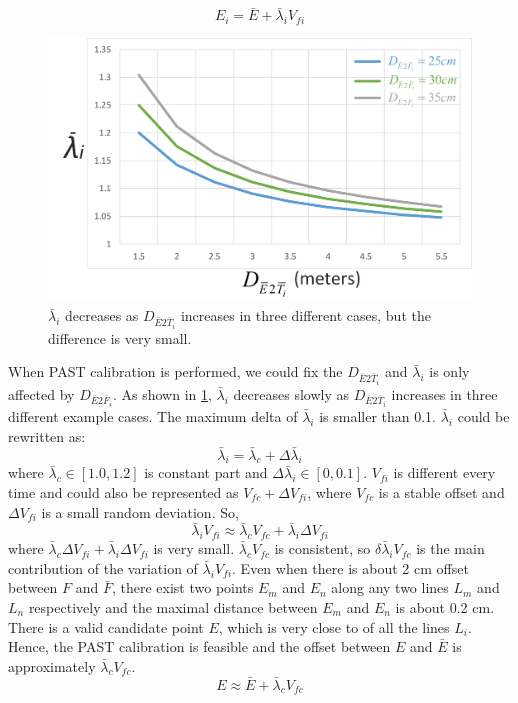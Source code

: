 \begin{equation} \label{equ:P_eye2}
E_i = {\bar E} + \bar\lambda_i V_{fi}  
\end{equation}
\begin{figure} [htb]
	\centering
	\includegraphics[width= \linewidth]{figures/3-PAST/lambdai.png}
	\caption{$\bar \lambda_i$ decreases as $D_{\bar E2 \bar T_i}$ increases in three different cases, but the difference is very small.}
	\label{fig:3-PAST:lambdai}
\end{figure}
When PAST calibration is performed, we could fix the $D_{\bar E2 \bar T_i}$ and $\bar \lambda_i$ is only affected by $ D_{\bar E2 \bar F_i}$. As shown in \figurename{ \ref{fig:3-PAST:lambdai}}, $\bar \lambda_i$ decreases slowly as $D_{\bar E2 \bar T_i}$ increases in three different example cases. The maximum delta of $\bar \lambda_i$ is smaller than 0.1. $\bar\lambda_i$ could be rewritten as:
\begin{equation} \label{equ:lambdai}
\bar\lambda_i = \bar\lambda_c + \Delta \bar\lambda_i
\end{equation}
where $\bar\lambda_c \in \left[1.0,1.2\right]$ is constant part and $\Delta \bar\lambda_i \in \left[0,0.1\right] $. 
$V_{fi}$ is different every time and could also be represented as $V_{fc} + {\Delta V_{fi}}$, where $V_{fc}$ is a stable offset and ${\Delta V_{fi}}$ is a small random deviation. So,
\begin{equation} \label{equ:lambdavf}
\bar\lambda_i V_{fi} \approx  \bar\lambda_c V_{fc}  + \bar\lambda_i {\Delta V_{fi}} %
\end{equation}
where $\bar\lambda_c {\Delta V_{fi}} + \bar\lambda_i {\Delta V_{fi}}$ is very small.  $\bar\lambda_c V_{fc}$ is consistent, so $\delta \bar\lambda_{i} V_{fc}$ is the main contribution of the variation of $\bar\lambda_i V_{fi}$. Even when there is about 2 cm offset between $F$ and $\bar{F}$, there exist two points $E_m$ and $E_n$ along any two lines $L_m$ and $L_n$ respectively and the maximal distance between $E_m$ and $E_n$ is about 0.2 cm. There is a valid candidate point $E$, which is very close to of all the lines $L_i$. Hence, the PAST calibration is feasible and the offset between $E$ and $\bar{E}$ is approximately $ \bar\lambda_c V_{fc}$. 
\begin{equation} \label{equ:P_eyeCalib}
E \approx {\bar E} + \bar\lambda_c V_{fc} 
\end{equation} 
